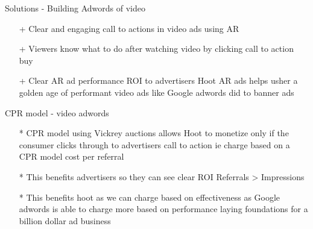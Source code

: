 \documentclass[10pt]{beamer}
\begin{document}
\begin{frame}[fragile]{Solutions - Building Adwords of video}
\begin{itemize}
\item[+]Clear and engaging call to actions in video ads using AR
\pause
\item[+]Viewers know what to do after watching video by clicking call to action buy 
\pause
\item[+]Clear AR ad performance ROI to advertisers 
\pause
Hoot AR ads helps usher a golden age of performant video ads like Google adwords did to banner ads

\end{itemize}


\end{frame}
\begin{frame}[t]{CPR model - video adwords}
\begin{itemize}
\item[*]CPR model using Vickrey auctions allows Hoot to monetize only if the consumer clicks through to advertisers call to action ie charge based on a CPR model cost per referral
\pause
\item[*]This benefits advertisers so they can see clear ROI Referrals > Impressions
\pause
\item[*]This benefits hoot as we can charge based on effectiveness as Google adwords is able to charge more based on performance laying foundations for a billion dollar ad business
\end{itemize}
\end{frame}
\end{document}
